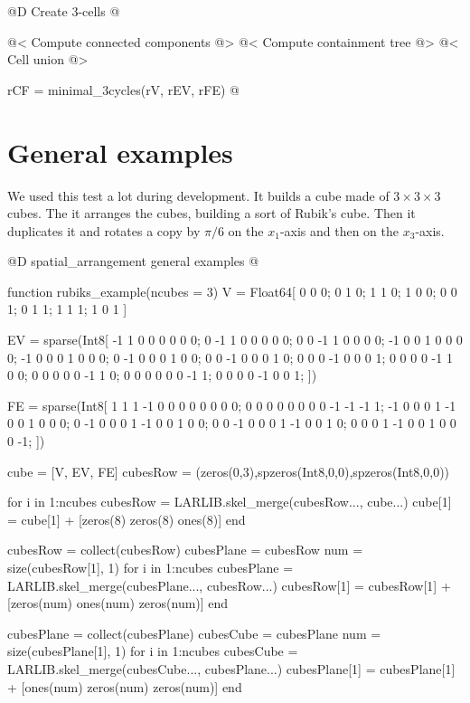 @D Create 3-cells
@{@< Compute connected components @>
@< Compute containment tree @>
@< Cell union @>

rCF = minimal_3cycles(rV, rEV, rFE)
@}


\section{General examples}
\label{sec:spatial_arrangement_examples}

We used this test a lot during development. It builds
a cube made of $3 \times 3 \times 3$ cubes. The it arranges
the cubes, building a sort of Rubik's cube. Then it duplicates
it and rotates a copy by $\pi / 6$ on the $x_1$-axis
and then on the $x_3$-axis.

@D spatial\_arrangement general examples
@{function rubiks_example(ncubes = 3)
    V = Float64[
        0 0 0; 0 1 0;
        1 1 0; 1 0 0;
        0 0 1; 0 1 1;
        1 1 1; 1 0 1
    ]

    EV = sparse(Int8[
        -1  1  0  0  0  0  0  0;
        0 -1  1  0  0  0  0  0;
        0  0 -1  1  0  0  0  0;
        -1  0  0  1  0  0  0  0;
        -1  0  0  0  1  0  0  0;
        0 -1  0  0  0  1  0  0;
        0  0 -1  0  0  0  1  0;
        0  0  0 -1  0  0  0  1;
        0  0  0  0 -1  1  0  0;
        0  0  0  0  0 -1  1  0;
        0  0  0  0  0  0 -1  1;
        0  0  0  0 -1  0  0  1;
    ])

    FE = sparse(Int8[
        1  1  1 -1  0  0  0  0  0  0  0  0;
        0  0  0  0  0  0  0  0 -1 -1 -1  1;
        -1  0  0  0  1 -1  0  0  1  0  0  0;
        0 -1  0  0  0  1 -1  0  0  1  0  0;
        0  0 -1  0  0  0  1 -1  0  0  1  0;
        0  0  0  1 -1  0  0  1  0  0  0 -1;
    ])

    cube = [V, EV, FE]
    cubesRow = (zeros(0,3),spzeros(Int8,0,0),spzeros(Int8,0,0))

    for i in 1:ncubes
        cubesRow = LARLIB.skel_merge(cubesRow..., cube...)
        cube[1] = cube[1] + [zeros(8) zeros(8) ones(8)]
    end

    cubesRow = collect(cubesRow)
    cubesPlane = cubesRow
    num = size(cubesRow[1], 1)
    for i in 1:ncubes
        cubesPlane = LARLIB.skel_merge(cubesPlane..., cubesRow...)
        cubesRow[1] = cubesRow[1] + [zeros(num) ones(num) zeros(num)]
    end

    cubesPlane = collect(cubesPlane)
    cubesCube = cubesPlane
    num = size(cubesPlane[1], 1)
    for i in 1:ncubes
        cubesCube = LARLIB.skel_merge(cubesCube..., cubesPlane...)
        cubesPlane[1] = cubesPlane[1] + [ones(num) zeros(num) zeros(num)]
    end

}
